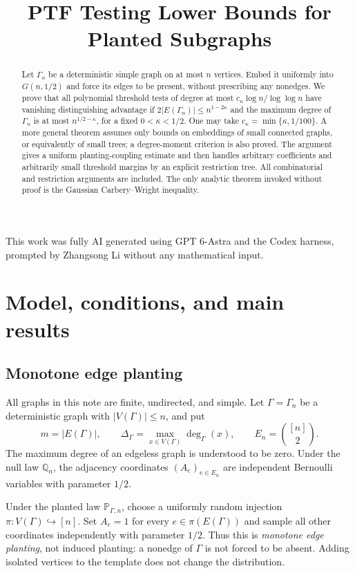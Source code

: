 \documentclass[11pt]{article}
\title{PTF Testing Lower Bounds for Planted Subgraphs}
\author{}
\date{}
\makeatletter
\newcommand{\Pp}{\mathbb P}
\newcommand{\Qq}{\mathbb Q}
\newcommand{\1}{\mathbf 1}
\theoremstyle{definition}
\theoremstyle{remark}
\numberwithin{equation}{section}
\renewcommand{\maketitle}{%
  \begin{center}
    {\LARGE\@title\par}
  \end{center}}
\makeatother
\begin{document}
\maketitle

\begin{abstract}
Let $\Gamma_n$ be a deterministic simple graph on at most $n$ vertices. Embed it uniformly into $G(n,1/2)$ and force its edges to be present, without prescribing any nonedges. We prove that all polynomial threshold tests of degree at most $c_\kappa\log n/\log\log n$ have vanishing distinguishing advantage if $2|E(\Gamma_n)|\le n^{1-2\kappa}$ and the maximum degree of $\Gamma_n$ is at most $n^{1/2-\kappa}$, for a fixed $0<\kappa<1/2$. One may take $c_\kappa=\min\{\kappa,1/100\}$. A more general theorem assumes only bounds on embeddings of small connected graphs, or equivalently of small trees; a degree-moment criterion is also proved. The argument gives a uniform planting-coupling estimate and then handles arbitrary coefficients and arbitrarily small threshold margins by an explicit restriction tree. All combinatorial and restriction arguments are included. The only analytic theorem invoked without proof is the Gaussian Carbery--Wright inequality.
\end{abstract}

 This work was fully AI generated using GPT 6-Astra and the Codex harness, prompted by Zhangsong Li without any mathematical input.

\section{Model, conditions, and main results}

\subsection{Monotone edge planting}
All graphs in this note are finite, undirected, and simple. Let $\Gamma=\Gamma_n$ be a deterministic graph with $|V(\Gamma)|\le n$, and put
\[
 m=|E(\Gamma)|,\qquad
 \Delta_\Gamma=\max_{x\in V(\Gamma)}\deg_\Gamma(x),\qquad
 E_n=\binom{[n]}2.
\]
The maximum degree of an edgeless graph is understood to be zero. Under the null law $\Qq_n$, the adjacency coordinates $(A_e)_{e\in E_n}$ are independent Bernoulli variables with parameter $1/2$.

Under the planted law $\Pp_{\Gamma,n}$, choose a uniformly random injection $\pi:V(\Gamma)\hookrightarrow[n]$. Set $A_e=1$ for every $e\in\pi(E(\Gamma))$ and sample all other coordinates independently with parameter $1/2$. Thus this is \emph{monotone edge planting}, not induced planting: a nonedge of $\Gamma$ is not forced to be absent. Adding isolated vertices to the template does not change the distribution.
\end{document}
